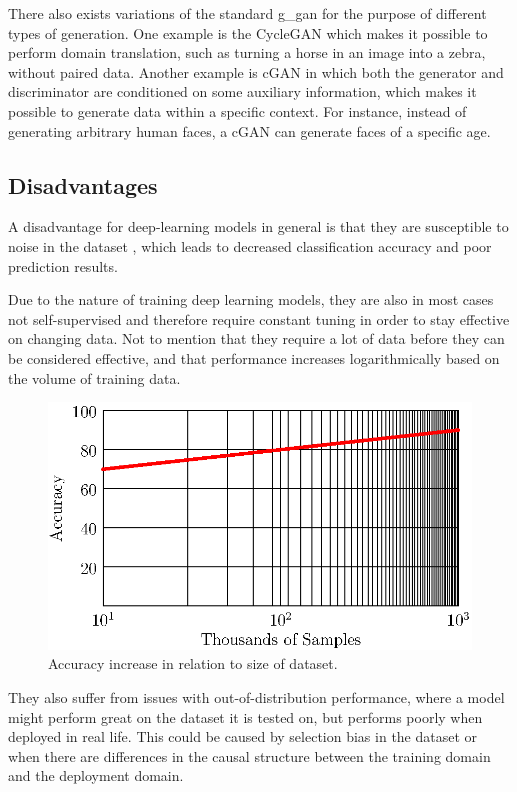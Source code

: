 \par
There also exists variations of the standard \gls*{g_gan} for the purpose of different types of generation. One example is the CycleGAN\cite{CycleGAN} which makes it possible to perform domain translation, such as turning a horse in an image into a zebra, without paired data. Another example is cGAN\cite{cgan}  in which both the generator and discriminator are conditioned on some auxiliary information, which makes it possible to generate data within a specific context. For instance, instead of generating arbitrary human faces, a cGAN can generate faces of a specific age.
\subsection{Disadvantages}
A disadvantage for deep-learning models in general is that they are susceptible to noise in the dataset \cite{noise1,noise2}, which leads to decreased classification accuracy and poor prediction results.
\par
Due to the nature of training deep learning models, they are also in most cases not self-supervised and therefore require constant tuning in order to stay effective on changing data. Not to mention that they require a lot of data before they can be considered effective, and that performance increases logarithmically based on the volume of training data\cite{deeplearning_dataset}.
\begin{figure}[H]
    \centering
    \includegraphics[width=0.8\linewidth]{resources/related_works/training_volume}
    \caption{Accuracy increase in relation to size of dataset.}
\end{figure}
They also suffer from issues with out-of-distribution performance, where a model might perform great on the dataset it is tested on, but performs poorly when deployed in real life. This could be caused by selection bias in the dataset or when there are differences in the causal structure between the training domain and the deployment domain\cite{deeplearning_ood}.
